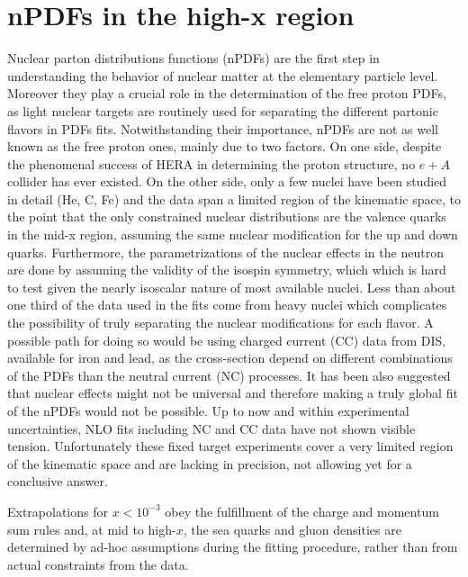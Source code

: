 


%
\section{nPDFs in the high-x region}

Nuclear parton distributions functions (nPDFs) are the first step in understanding the behavior of nuclear matter at the elementary particle level. Moreover they play a crucial role in the determination of the free proton PDFs, as light nuclear targets are routinely used for separating the different partonic flavors in PDFs fits. Notwithstanding their importance, nPDFs are not as well known as the free proton ones, mainly due to two factors. On one side, despite the phenomenal success of HERA in determining the proton structure, no $e+A$ collider has ever existed. On the other side, only a few nuclei have been studied in detail (He, C, Fe) and the data span a limited region of the kinematic space, to the point that the only constrained nuclear distributions are the valence quarks in the mid-x region, assuming the same nuclear modification for the up and down quarks. Furthermore, the parametrizations of the nuclear effects in the neutron are done by assuming the validity of the isospin symmetry, which which is hard to test given the nearly isoscalar nature of most available nuclei.  Less than about one third of the data used in the fits come from heavy nuclei which complicates the possibility of truly separating the nuclear modifications for each flavor. A possible path for doing so would be using charged current (CC) data from DIS, available for iron and lead, as the cross-section depend on different combinations of the PDFs than the neutral current (NC) processes. It has been also suggested that nuclear effects might not be universal and therefore making a truly global fit of the nPDFs would not be possible. Up to now and within experimental uncertainties, NLO fits including NC and CC data have not shown visible tension. Unfortunately these fixed target experiments cover a very limited region of the kinematic space and are lacking in precision, not allowing yet for a conclusive answer.


 Extrapolations for $x < 10^{-3}$ obey the fulfillment of the charge and momentum sum rules and, at mid to high-$x$, the sea quarks and gluon densities are determined by ad-hoc assumptions during the fitting procedure, rather than from actual constraints from the data. 

